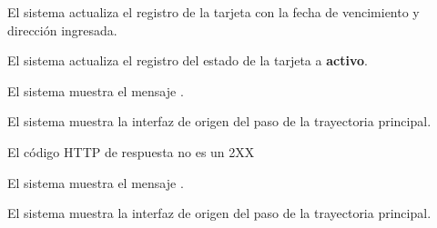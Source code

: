 {\begin{trayectoriaAlternativa}
    \item El sistema actualiza el registro de la tarjeta con la fecha de
      vencimiento y dirección ingresada.

    \item El sistema actualiza el registro del estado de la tarjeta a
      \textbf{activo}.

    \item El sistema muestra el mensaje
      .

    \item El sistema muestra la interfaz de origen del paso
       de la trayectoria principal.

  \end{trayectoriaAlternativa}


  \begin{trayectoriaAlternativa}
    {El código HTTP de respuesta no es un 2XX}

    \item El sistema muestra el mensaje
      .

    \item El sistema muestra la interfaz de origen del paso
       de la trayectoria principal.

  \end{trayectoriaAlternativa}
}
